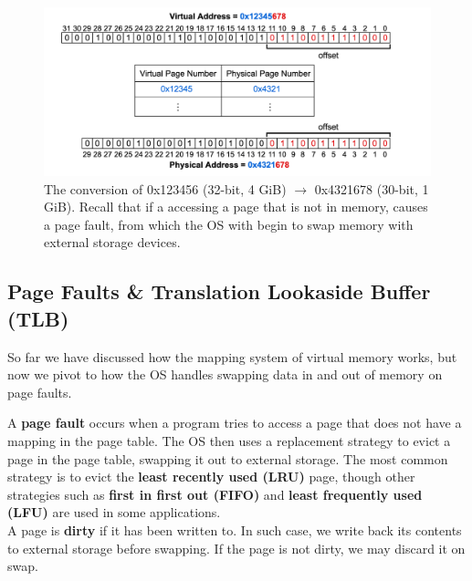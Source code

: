 \begin{figure}[h]
    \centering
    \includegraphics[width=\textwidth]{Sections/virt/conv.png}
    
    \vspace{1em}
    \caption{The conversion of 0x123456 (32-bit, 4 GiB) $\to$ 0x4321678 (30-bit, 1 GiB). Recall that if a accessing a page that is not in memory, causes a page fault, from which the OS with begin to swap memory with external storage devices.}
    
    \label{fig:virt5}
\end{figure}

\newpage 

\subsection{Page Faults \& Translation Lookaside Buffer (TLB)}

So far we have discussed how the mapping system of virtual memory works, but now we pivot to how the OS handles swapping data in and out of memory on page faults.

\begin{Def}

    A \textbf{page fault} occurs when a program tries to access a page that does not have a mapping in the page table. 
    The OS then uses a replacement strategy to evict a page in the page table, swapping it out to external storage. 
    The most common strategy is to evict the \textbf{least recently used (LRU)} page, though other strategies such as \textbf{first in first out (FIFO)} and \textbf{least frequently used (LFU)} are used in some applications.\\
    
    \noindent
    A page is \textbf{dirty} if it has been written to. In 
    such case, we write back its contents to external storage before swapping. If the page is not dirty, we may discard it on swap.
\end{Def}

